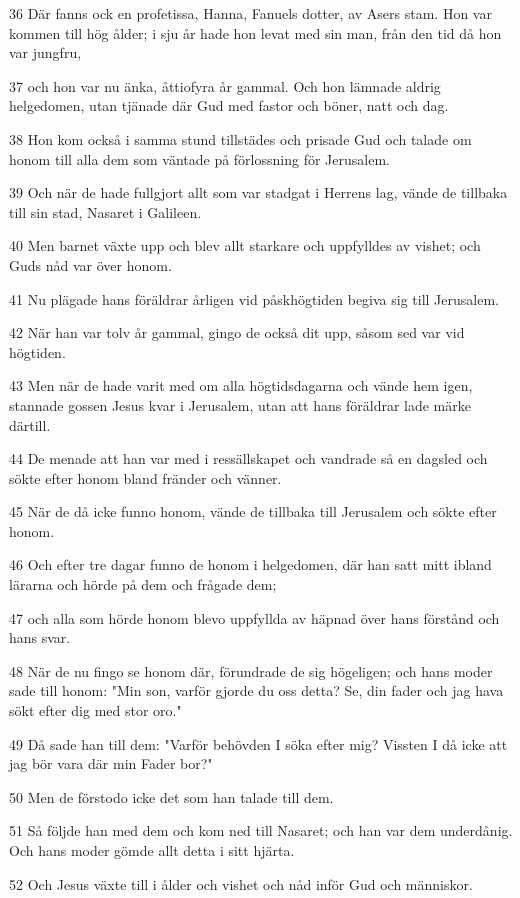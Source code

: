 \par 36 Där fanns ock en profetissa, Hanna, Fanuels dotter, av Asers stam. Hon var kommen till hög ålder; i sju år hade hon levat med sin man, från den tid då hon var jungfru,
\par 37 och hon var nu änka, åttiofyra år gammal. Och hon lämnade aldrig helgedomen, utan tjänade där Gud med fastor och böner, natt och dag.
\par 38 Hon kom också i samma stund tillstädes och prisade Gud och talade om honom till alla dem som väntade på förlossning för Jerusalem.
\par 39 Och när de hade fullgjort allt som var stadgat i Herrens lag, vände de tillbaka till sin stad, Nasaret i Galileen.
\par 40 Men barnet växte upp och blev allt starkare och uppfylldes av vishet; och Guds nåd var över honom.
\par 41 Nu plägade hans föräldrar årligen vid påskhögtiden begiva sig till Jerusalem.
\par 42 När han var tolv år gammal, gingo de också dit upp, såsom sed var vid högtiden.
\par 43 Men när de hade varit med om alla högtidsdagarna och vände hem igen, stannade gossen Jesus kvar i Jerusalem, utan att hans föräldrar lade märke därtill.
\par 44 De menade att han var med i ressällskapet och vandrade så en dagsled och sökte efter honom bland fränder och vänner.
\par 45 När de då icke funno honom, vände de tillbaka till Jerusalem och sökte efter honom.
\par 46 Och efter tre dagar funno de honom i helgedomen, där han satt mitt ibland lärarna och hörde på dem och frågade dem;
\par 47 och alla som hörde honom blevo uppfyllda av häpnad över hans förstånd och hans svar.
\par 48 När de nu fingo se honom där, förundrade de sig högeligen; och hans moder sade till honom: "Min son, varför gjorde du oss detta? Se, din fader och jag hava sökt efter dig med stor oro."
\par 49 Då sade han till dem: "Varför behövden I söka efter mig? Vissten I då icke att jag bör vara där min Fader bor?"
\par 50 Men de förstodo icke det som han talade till dem.
\par 51 Så följde han med dem och kom ned till Nasaret; och han var dem underdånig. Och hans moder gömde allt detta i sitt hjärta.
\par 52 Och Jesus växte till i ålder och vishet och nåd inför Gud och människor.

